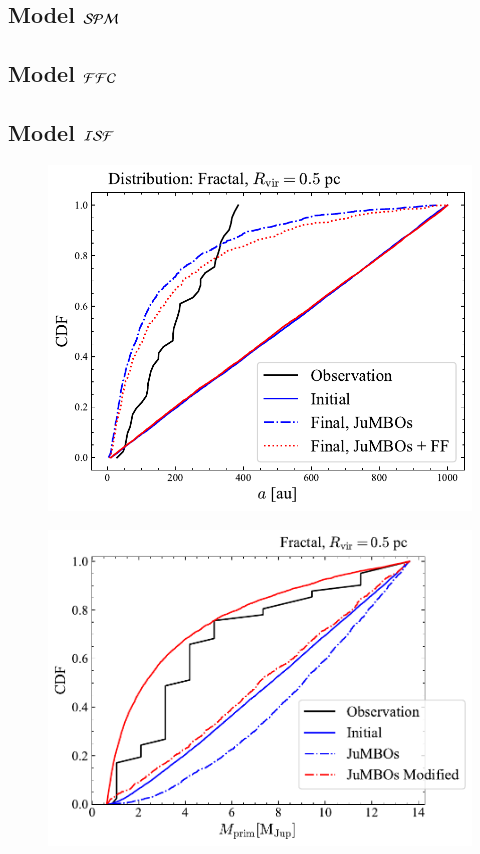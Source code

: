 \documentclass[aa]{lib/aa}
\begin{document}
\subsection{Model ${\cal SPM}$}


\subsection{Model ${\cal FFC}$}

\subsection{Model ${\cal ISF}$}

\begin{figure}
    \centering
        \includegraphics[width=.91\columnwidth]{figures/sem_axis_Fractal_FF.pdf}
        \caption{}
         \label{Fig:Fr_semimajor_axis}
\end{figure}

\begin{figure}
    \centering
        \includegraphics[width=.91\columnwidth]{figures/mprim_vs_obs_Fractal0.5Mod.pdf}
        \caption{}
         \label{Fig:Fr_primar_mass}
\end{figure}
\end{document}
